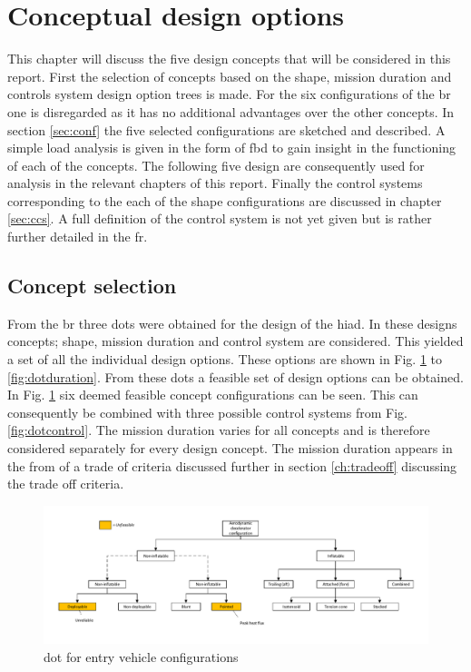 \section{Conceptual design options} \label{ch:options}
This chapter will discuss the five design concepts that will be considered in this report. First the selection of concepts based on the shape, mission duration and controls system design option trees is made. For the six configurations of the \gls{br} one is disregarded as it has no additional advantages over the other concepts. In section \ref{sec:conf} the five selected configurations are sketched and described. A simple load analysis is given in the form of \gls{fbd} to gain insight in the functioning of each of the concepts. The following five design are consequently used for analysis in the relevant chapters of this report. Finally the control systems corresponding to the each of the shape configurations are discussed in chapter \ref{sec:ccs}. A full definition of the control system is not yet given but is rather further detailed in the \gls{fr}.

\subsection{Concept selection}
 From the \acrfull{br} three \glspl{dot} were obtained for the design of the \gls{hiad}. In these designs concepts; shape, mission duration and control system are considered. This yielded a set of all the individual design options. These options are shown in Fig. \ref{fig:dotshape} to \ref{fig:dotduration}. From these \glspl{dot} a feasible set of design options can be obtained. In Fig. \ref{fig:dotshape} six deemed feasible concept configurations can be seen. This can consequently be combined with three possible control systems from Fig. \ref{fig:dotcontrol}. The mission duration varies for all concepts and is therefore considered separately for every design concept. The mission duration appears in the from of a trade of criteria discussed further in section \ref{ch:tradeoff} discussing the trade off criteria.

\begin{figure}[H]
\hspace{-23mm}
\includegraphics[width = 1.25\textwidth]{Figure/DOT_configuration.pdf}
\vspace{-5mm}
\caption{\acrlong{dot} for entry vehicle configurations}
\label{fig:dotshape}
\end{figure}

